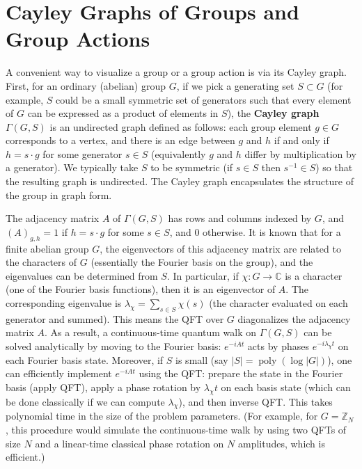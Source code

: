 \documentclass[11pt]{article}
\theoremstyle{definition}
\begin{document}
\section{Cayley Graphs of Groups and Group Actions}
A convenient way to visualize a group or a group action is via its Cayley graph. First, for an ordinary (abelian) group $G$, if we pick a generating set $S \subset G$ (for example, $S$ could be a small symmetric set of generators such that every element of $G$ can be expressed as a product of elements in $S$), the \textbf{Cayley graph} $\Gamma(G,S)$ is an undirected graph defined as follows: each group element $g \in G$ corresponds to a vertex, and there is an edge between $g$ and $h$ if and only if $h = s \cdot g$ for some generator $s \in S$ (equivalently $g$ and $h$ differ by multiplication by a generator). We typically take $S$ to be symmetric (if $s \in S$ then $s^{-1} \in S$) so that the resulting graph is undirected. The Cayley graph encapsulates the structure of the group in graph form.

The adjacency matrix $A$ of $\Gamma(G,S)$ has rows and columns indexed by $G$, and $(A)_{g,h} = 1$ if $h = s\cdot g$ for some $s \in S$, and $0$ otherwise. It is known that for a finite abelian group $G$, the eigenvectors of this adjacency matrix are related to the characters of $G$ (essentially the Fourier basis on the group), and the eigenvalues can be determined from $S$. In particular, if $\chi: G \to \mathbb{C}$ is a character (one of the Fourier basis functions), then it is an eigenvector of $A$. The corresponding eigenvalue is $\lambda_{\chi} = \sum_{s\in S} \chi(s)$ (the character evaluated on each generator and summed). This means the QFT over $G$ diagonalizes the adjacency matrix $A$. As a result, a continuous-time quantum walk on $\Gamma(G,S)$ can be solved analytically by moving to the Fourier basis: $e^{-iAt}$ acts by phases $e^{-i\lambda_{\chi} t}$ on each Fourier basis state. Moreover, if $S$ is small (say $|S| = \operatorname{poly}(\log |G|)$), one can efficiently implement $e^{-iAt}$ using the QFT: prepare the state in the Fourier basis (apply QFT), apply a phase rotation by $\lambda_{\chi} t$ on each basis state (which can be done classically if we can compute $\lambda_{\chi}$), and then inverse QFT. This takes polynomial time in the size of the problem parameters. (For example, for $G=\mathbb{Z}_N$, this procedure would simulate the continuous-time walk by using two QFTs of size $N$ and a linear-time classical phase rotation on $N$ amplitudes, which is efficient.)
\end{document}
